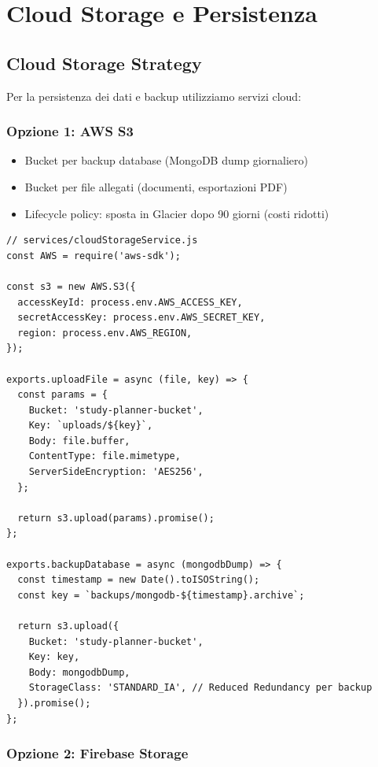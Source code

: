 \documentclass[12pt,a4paper]{report}
\begin{document}
\newpage

\chapter{Cloud Storage e Persistenza}

\section{Cloud Storage Strategy}

Per la persistenza dei dati e backup utilizziamo servizi cloud:

\subsection{Opzione 1: AWS S3}

\begin{itemize}
    \item Bucket per backup database (MongoDB dump giornaliero)
    \item Bucket per file allegati (documenti, esportazioni PDF)
    \item Lifecycle policy: sposta in Glacier dopo 90 giorni (costi ridotti)
\end{itemize}

\begin{lstlisting}
// services/cloudStorageService.js
const AWS = require('aws-sdk');

const s3 = new AWS.S3({
  accessKeyId: process.env.AWS_ACCESS_KEY,
  secretAccessKey: process.env.AWS_SECRET_KEY,
  region: process.env.AWS_REGION,
});

exports.uploadFile = async (file, key) => {
  const params = {
    Bucket: 'study-planner-bucket',
    Key: `uploads/${key}`,
    Body: file.buffer,
    ContentType: file.mimetype,
    ServerSideEncryption: 'AES256',
  };
  
  return s3.upload(params).promise();
};

exports.backupDatabase = async (mongodbDump) => {
  const timestamp = new Date().toISOString();
  const key = `backups/mongodb-${timestamp}.archive`;
  
  return s3.upload({
    Bucket: 'study-planner-bucket',
    Key: key,
    Body: mongodbDump,
    StorageClass: 'STANDARD_IA', // Reduced Redundancy per backup
  }).promise();
};
\end{lstlisting}

\subsection{Opzione 2: Firebase Storage}
\end{document}
